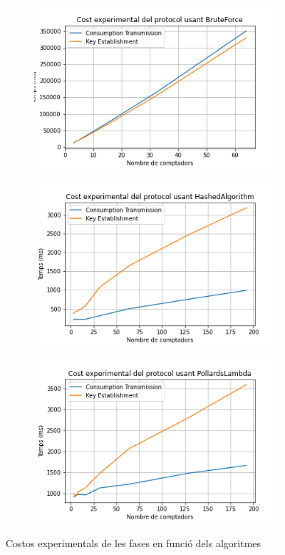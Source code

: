\begin{figure}[H]
	\centering
	\begin{subfigure}[b]{0.47\textwidth}
		\centering
		\includegraphics[width=\textwidth]{imgs/cost/brute.png}
	\end{subfigure}
\begin{subfigure}[b]{0.47\textwidth}
	\centering
	\includegraphics[width=\textwidth]{imgs/cost/hashed.png}
\end{subfigure}
\begin{subfigure}[b]{0.47\textwidth}
	\centering
	\includegraphics[width=\textwidth]{imgs/cost/pollards.png}
\end{subfigure}
	\caption{Costos experimentals de les fases en funció dels algoritmes}
	\label{fig:algorithms}
\end{figure}
